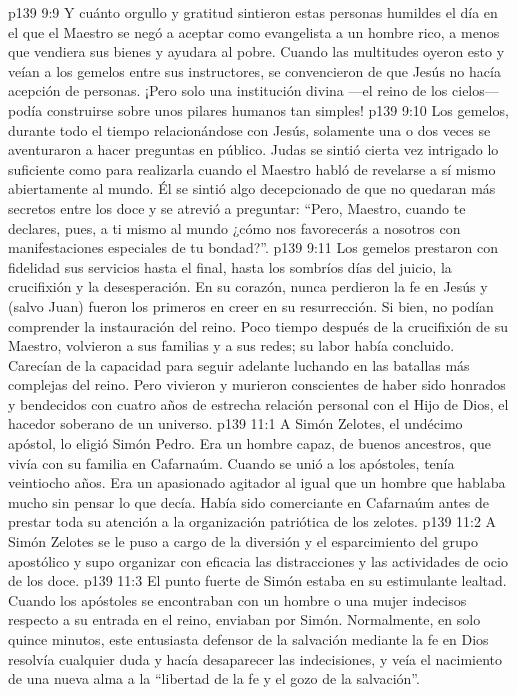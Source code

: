 \vs p139 9:9 Y cuánto orgullo y gratitud sintieron estas personas humildes el día en el que el Maestro se negó a aceptar como evangelista a un hombre rico, a menos que vendiera sus bienes y ayudara al pobre. Cuando las multitudes oyeron esto y veían a los gemelos entre sus instructores, se convencieron de que Jesús no hacía acepción de personas. ¡Pero solo una institución divina ---el reino de los cielos--- podía construirse sobre unos pilares humanos tan simples!
\vs p139 9:10 Los gemelos, durante todo el tiempo relacionándose con Jesús, solamente una o dos veces se aventuraron a hacer preguntas en público. Judas se sintió cierta vez intrigado lo suficiente como para realizarla cuando el Maestro habló de revelarse a sí mismo abiertamente al mundo. Él se sintió algo decepcionado de que no quedaran más secretos entre los doce y se atrevió a preguntar: “Pero, Maestro, cuando te declares, pues, a ti mismo al mundo ¿cómo nos favorecerás a nosotros con manifestaciones especiales de tu bondad?”.
\vs p139 9:11 \pc Los gemelos prestaron con fidelidad sus servicios hasta el final, hasta los sombríos días del juicio, la crucifixión y la desesperación. En su corazón, nunca perdieron la fe en Jesús y (salvo Juan) fueron los primeros en creer en su resurrección. Si bien, no podían comprender la instauración del reino. Poco tiempo después de la crucifixión de su Maestro, volvieron a sus familias y a sus redes; su labor había concluido. Carecían de la capacidad para seguir adelante luchando en las batallas más complejas del reino. Pero vivieron y murieron conscientes de haber sido honrados y bendecidos con cuatro años de estrecha relación personal con el Hijo de Dios, el hacedor soberano de un universo.
\vs p139 11:1 A Simón Zelotes, el undécimo apóstol, lo eligió Simón Pedro. Era un hombre capaz, de buenos ancestros, que vivía con su familia en Cafarnaúm. Cuando se unió a los apóstoles, tenía veintiocho años. Era un apasionado agitador al igual que un hombre que hablaba mucho sin pensar lo que decía. Había sido comerciante en Cafarnaúm antes de prestar toda su atención a la organización patriótica de los zelotes.
\vs p139 11:2 \pc A Simón Zelotes se le puso a cargo de la diversión y el esparcimiento del grupo apostólico y supo organizar con eficacia las distracciones y las actividades de ocio de los doce.
\vs p139 11:3 El punto fuerte de Simón estaba en su estimulante lealtad. Cuando los apóstoles se encontraban con un hombre o una mujer indecisos respecto a su entrada en el reino, enviaban por Simón. Normalmente, en solo quince minutos, este entusiasta defensor de la salvación mediante la fe en Dios resolvía cualquier duda y hacía desaparecer las indecisiones, y veía el nacimiento de una nueva alma a la “libertad de la fe y el gozo de la salvación”.
